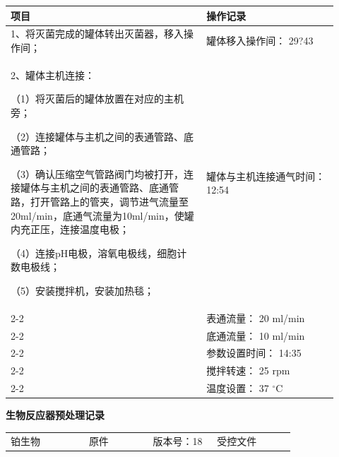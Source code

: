 \documentclass[UTF8,10pt,a4paper,fontset=fandol]{ctexart}
\newcommand{\fieldvalue}[1]{#1}
\newcommand{\handwritten}[1]{#1}
\begin{document}
\noindent
\begin{tabular}{|p{0.55\linewidth}|p{0.37\linewidth}|}
\hline
\centering 项目 & \centering 操作记录\\
\hline
1、将灭菌完成的罐体转出灭菌器，移入操作间； &
罐体移入操作间：
\fieldvalue{\handwritten{29?43}}\\
\hline
2、罐体主机连接：\par
（1）将灭菌后的罐体放置在对应的主机旁；\par
（2）连接罐体与主机之间的表通管路、底通管路；\par
（3）确认压缩空气管路阀门均被打开，连接罐体与主机之间的表通管路、底通管路，打开管路上的管夹，调节进气流量至20ml/min，底通气流量为10ml/min，使罐内充正压，连接温度电极；\par
（4）连接pH电极，溶氧电极线，细胞计数电极线；\par
（5）安装搅拌机，安装加热毯； &
罐体与主机连接通气时间：
\fieldvalue{\handwritten{12:54}}\\
\cline{2-2}
& 表通流量：
\fieldvalue{\handwritten{20}} ml/min\\
\cline{2-2}
& 底通流量：
\fieldvalue{\handwritten{10}} ml/min\\
\cline{2-2}
& 参数设置时间：
\fieldvalue{\handwritten{14:35}}\\
\cline{2-2}
& 搅拌转速：
\fieldvalue{\handwritten{25}} rpm\\
\cline{2-2}
& 温度设置：
\fieldvalue{\handwritten{37}} ${}^{\circ}$C\\
\hline
\end{tabular}


\newpage

\begin{center}
\textbf{生物反应器预处理记录}
\end{center}

\noindent
\begin{tabular}{p{0.22\linewidth}p{0.18\linewidth}p{0.18\linewidth}p{0.22\linewidth}}
\centering 铂生物 & \centering 原件 & \centering 版本号：18 & \centering 受控文件
\end{tabular}
\end{document}
